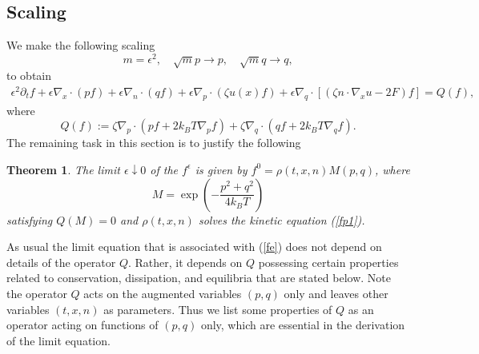 \documentclass[reqno]{amsart}
\numberwithin{equation}{section}
\newtheorem{Theorem}{Theorem}[section]
\theoremstyle{definition}
\theoremstyle{remark}
\begin{document}
\subsection{Scaling}
We make the following scaling
$$
m=\epsilon^2, \quad \sqrt{m}p \to p, \quad \sqrt{m}q \to q,
$$
to obtain
\begin{align} \label{fe}
\epsilon^2 \partial_t f +\epsilon \nabla_x\cdot(pf)+ \epsilon \nabla_n\cdot(qf)+\epsilon
\nabla_p \cdot (\zeta u(x)f)+\epsilon \nabla_q\cdot[(\zeta n\cdot
\nabla_x u -2F)f]=Q(f),
\end{align}
where
$$
Q(f):=\zeta \nabla_p \cdot(pf +2k_BT \nabla_p f)+\zeta \nabla_q
\cdot(qf +2k_BT \nabla_q f).
$$
The remaining task in this section is to justify the following
\begin{Theorem}
The limit $\epsilon \downarrow 0$ of the $f^\epsilon$ is given by $f^0=\rho(t, x, n)M(p, q)$, where
\begin{equation}\label{m}
M=\exp\left(-\frac{p^2+q^2}{4k_BT}\right)
\end{equation}
satisfying $Q(M)=0$ and $\rho(t, x, n)$ solves the kinetic equation (\ref{fp1}).
\end{Theorem}
As usual the limit equation that is associated with (\ref{fe}) does
not depend on details of the operator $Q$. Rather, it depends on $Q$
possessing certain properties related to conservation, dissipation,
and equilibria that are stated below.  Note the operator $Q$ acts on
the augmented variables $(p, q)$ only and leaves other variables
$(t, x, n)$ as parameters. Thus we list some properties of $Q$ as an
operator acting on functions of $(p, q)$ only, which are essential
in the derivation of the limit equation.
\end{document}
